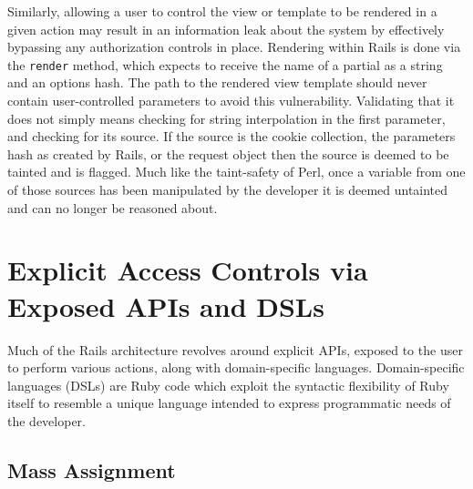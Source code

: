 \documentclass[conference]{IEEEtran}
\begin{document}
Similarly, allowing a user to control the view or template to be rendered in a given
action may result in an information leak about the system by effectively bypassing any
authorization controls in place.  Rendering within Rails is done via the
\texttt{render}\cite{render_method} method, which expects to receive the name of a partial
as a string and an options hash.  The path to the rendered view template should never
contain user-controlled parameters to avoid this vulnerability.  Validating that it does
not simply means checking for string interpolation in the first parameter, and checking
for its source.  If the source is the cookie collection, the parameters hash as created by
Rails, or the request object then the source is deemed to be tainted and is flagged.  Much
like the taint-safety of Perl, once a variable from one of those sources has been
manipulated by the developer it is deemed untainted and can no longer be reasoned about.

\section{Explicit Access Controls via Exposed APIs and DSLs}

Much of the Rails architecture revolves around explicit APIs, exposed to the user to
perform various actions, along with domain-specific languages.  Domain-specific languages
(DSLs) are Ruby code which exploit the syntactic flexibility of Ruby itself to resemble a
unique language intended to express programmatic needs of the developer.

\subsection{Mass Assignment}
\end{document}
